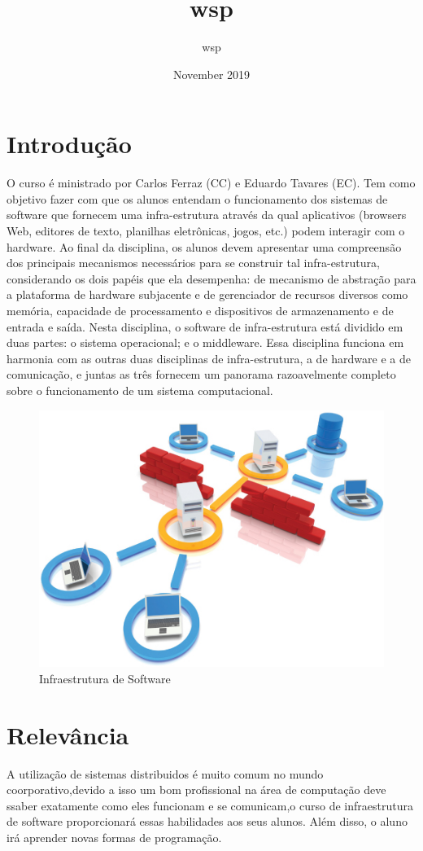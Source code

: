 \documentclass{paper}
\title{wsp}
\author{wsp }
\date{November 2019}
\begin{document}
\section{Introdução}
O curso é ministrado por Carlos Ferraz (CC) e Eduardo Tavares (EC). Tem como objetivo  fazer com que os alunos entendam o funcionamento dos sistemas de software que fornecem uma infra-estrutura através da qual aplicativos (browsers Web, editores de texto, planilhas eletrônicas, jogos, etc.) podem interagir com o hardware. Ao final da disciplina, os alunos devem apresentar uma compreensão dos principais mecanismos necessários para se construir tal infra-estrutura, considerando os dois papéis que ela desempenha: de mecanismo de abstração para a plataforma de hardware subjacente e de gerenciador de recursos diversos como memória, capacidade de processamento e dispositivos de armazenamento e de entrada e saída. Nesta disciplina, o software de infra-estrutura está dividido em duas partes:  o sistema operacional; e o  middleware. Essa disciplina funciona em harmonia com as outras duas disciplinas de infra-estrutura, a de hardware e a de comunicação, e juntas as três fornecem um panorama razoavelmente completo sobre o funcionamento de um sistema computacional.
\citep{chamada1}
\citep{chamada2}
\citep{chamada3}
\citep{chamada4}
\begin{figure}[h!]
\centering
\includegraphics[scale=0.6]{infraSoftware.jpg}
\caption{Infraestrutura de Software}
\label{fig:Infraestrutura de Software}
\end{figure}

\section{Relevância}
A utilização de sistemas distribuidos é muito comum no mundo coorporativo,devido a isso  um bom profissional na área de computação deve ssaber exatamente como eles funcionam e se comunicam,o curso de infraestrutura de software proporcionará essas habilidades aos seus alunos. Além disso, o aluno irá aprender novas formas de programação.
\end{document}
